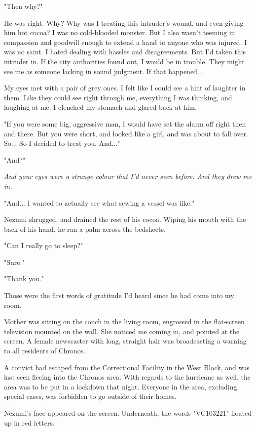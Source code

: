 "Then why?"

He was right. Why? Why was I treating this intruder's wound, and even
giving him hot cocoa? I was no cold-blooded monster. But I also wasn't
teeming in compassion and goodwill enough to extend a hand to anyone who
was injured. I was no saint. I hated dealing with hassles and
disagreements. But I'd taken this intruder in. If the city authorities
found out, I would be in trouble. They might see me as someone lacking
in sound judgment. If that happened...

My eyes met with a pair of grey ones. I felt like I could see a hint of
laughter in them. Like they could see right through me, everything I was
thinking, and laughing at me. I clenched my stomach and glared back at
him.

"If you were some big, aggressive man, I would have set the alarm off
right then and there. But you were short, and looked like a girl, and
was about to fall over. So... So I decided to treat you. And..."

"And?"

\emph{And your eyes were a strange colour that I'd never seen before. And they
drew me in.}

"And... I wanted to actually see what sewing a vessel was like."

Nezumi shrugged, and drained the rest of his cocoa. Wiping his mouth
with the back of his hand, he ran a palm across the bedsheets.

"Can I really go to sleep?"

"Sure."

"Thank you."

Those were the first words of gratitude I'd heard since he had come into
my room.

\mybreak

Mother was sitting on the couch in the living room, engrossed in the
flat-screen television mounted on the wall. She noticed me coming in,
and pointed at the screen. A female newscaster with long, straight hair
was broadcasting a warning to all residents of Chronos.

A convict had escaped from the Correctional Facility in the West Block,
and was last seen fleeing into the Chronos area. With regards to the
hurricane as well, the area was to be put in a lockdown that night.
Everyone in the area, excluding special cases, was forbidden to go
outside of their homes.

\myspace

Nezumi's face appeared on the screen. Underneath, the words "VC103221"
floated up in red letters.


